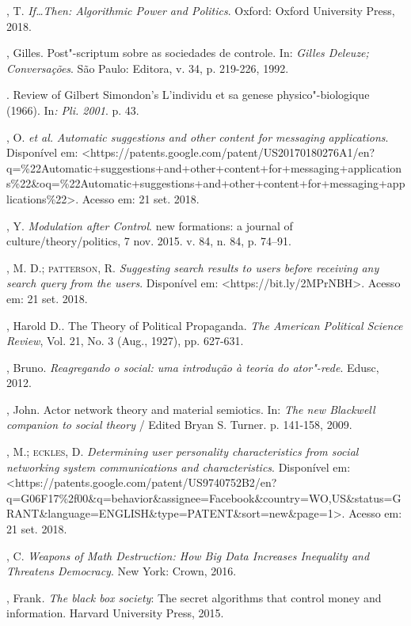 \begin{bibliohedra}
, T. \emph{If\ldots{}Then: Algorithmic Power and Politics}. Oxford:
Oxford University Press, 2018.

, Gilles. Post"-scriptum sobre as sociedades de controle. In:
\emph{Gilles Deleuze; Conversações}. São Paulo: Editora, v. 34, p.
219-226, 1992.

\titidem. Review of Gilbert Simondon's L'individu et sa
genese physico"-biologique (1966). In\emph{: Pli. 2001}. p. 43.

, O. \emph{et al.} \emph{Automatic suggestions and other
content for messaging applications}. Disponível em:
\textless{}https://patents.google.com/patent/US20170180276A1/en?q=\%22Automatic+suggestions+and+other+content+for+messaging+applications\%22\&oq=\%22Automatic+suggestions+and+other+content+for+messaging+applications\%22\textgreater{}.
Acesso em: 21 set. 2018.

, Y. \emph{Modulation after Control}. new formations: a journal of
culture/theory/politics, 7 nov. 2015. v. 84, n. 84, p. 74--91.

, M. D.; \textsc{patterson}, R. \emph{Suggesting search results to users
before receiving any search query from the users}. Disponível em:
\textless{}https://bit.ly/2MPrNBH\textgreater{}.
Acesso em: 21 set. 2018.

, Harold D.. The Theory of Political Propaganda. \emph{The
American Political Science Review}, Vol. 21, No. 3 (Aug., 1927), pp.
627-631.

, Bruno. \emph{Reagregando o social: uma introdução à teoria do
ator"-rede}. Edusc, 2012.

, John. Actor network theory and material semiotics. In: \emph{The
new Blackwell companion to social theory} / Edited Bryan S. Turner. p.
141-158, 2009.

, M.; \textsc{eckles}, D. \emph{Determining user personality
characteristics from social networking system communications and
characteristics}. Disponível em:
\textless{}https://patents.google.com/patent/US9740752B2/en?q=G06F17\%2f00\&q=behavior\&assignee=Facebook\&country=WO,US\&status=GRANT\&language=ENGLISH\&type=PATENT\&sort=new\&page=1\textgreater{}.
Acesso em: 21 set. 2018.

, C. \emph{Weapons of Math Destruction: How Big Data Increases
Inequality and Threatens Democracy}. New York: Crown, 2016.

, Frank\emph{. The black box society}: The secret algorithms
that control money and information. Harvard University Press, 2015.


\end{bibliohedra}
